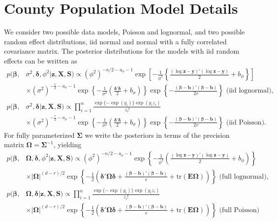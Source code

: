 \documentclass[12pt]{article}
\begin{document}
\section{County Population Model Details}\label{app:pop}
We consider two possible data models, Poisson and lognormal, and two possible random effect distributions, iid normal and normal with a fully correlated covariance matrix. The posterior distributions for the models with iid random effects can be written as
\begin{align*}
p(\bm{\beta},& \sigma^2, \bm{\delta}, \phi^2|\bm{z}, \bm{X}, \bm{S}) \propto (\phi^2)^{-n/2 - a_\phi - 1}\exp\left[-\frac{1}{\phi^2}\left\{\frac{(\log\bm{z} - \bm{y})'(\log\bm{z} - \bm{y})}{2} + b_\phi\right\}\right] \\
&\times (\sigma^2)^{-\frac{r}{2} - a_{\sigma}-1}\exp\left\{-\frac{1}{\sigma^2}\left(\frac{\bm{\delta}'\bm{\delta}}{2} + b_{\sigma}\right)\right\}\exp\left\{-\frac{(\bm{\beta} - \bm{b})'(\bm{\beta} - \bm{b})}{2v}\right\}\mbox{\ \ \ \ \ (iid lognormal),}\\
p(\bm{\beta},& \sigma^2, \bm{\delta}|\bm{z}, \bm{X}, \bm{S}) \propto \prod_{i=1}^n \frac{\exp\{-\exp(y_i)\}\exp(y_iz_i)}{z_i!}  \\
&\times (\sigma^2)^{-\frac{r}{2} - a_{\sigma}-1}\exp\left\{-\frac{1}{\sigma^2}\left(\frac{\bm{\delta}'\bm{\delta}}{2} + b_{\sigma}\right)\right\}\exp\left\{-\frac{(\bm{\beta} - \bm{b})'(\bm{\beta} - \bm{b})}{2v}\right\}\mbox{\ \ \ \ \ (iid Poisson).}
\end{align*}
For fully parameterized $\bm{\Sigma}$ we write the posteriors in terms of the precision matrix $\bm{\Omega} = \bm{\Sigma}^{-1}$, yielding
\begin{align*}
p(\bm{\beta},& \bm{\Omega}, \bm{\delta}, \phi^2|\bm{z}, \bm{X}, \bm{S}) \propto (\phi^2)^{-n/2 - a_\phi - 1}\exp\left\{-\frac{1}{\phi^2}\left(\frac{(\log\bm{z} - \bm{y})'(\log\bm{z} - \bm{y})}{2} + b_\phi\right)\right\} \\
&\times |\bm{\Omega}|^{(d - r)/2}\exp\left\{-\frac{1}{2}\left(\bm{\delta}'\bm{\Omega}\bm{\delta}+\frac{(\bm{\beta} - \bm{b})'(\bm{\beta} - \bm{b})}{v} + \mathrm{tr}(\bm{E}\bm{\Omega})\right)\right\}\mbox{\ \ \ \ \ (full lognormal),}\\
p(\bm{\beta},& \bm{\Omega}, \bm{\delta}|\bm{z}, \bm{X}, \bm{S}) \propto \prod_{i=1}^n \frac{\exp\{-\exp(y_i)\}\exp(y_iz_i)}{z_i!}  \\
&\times |\bm{\Omega}|^{(d - r)/2}\exp\left\{-\frac{1}{2}\left(\bm{\delta}'\bm{\Omega}\bm{\delta}+\frac{(\bm{\beta} - \bm{b})'(\bm{\beta} - \bm{b})}{v} + \mathrm{tr}(\bm{E}\bm{\Omega})\right)\right\}\mbox{\ \ \ \ \ (full Poisson)}
\end{align*}
\end{document}
